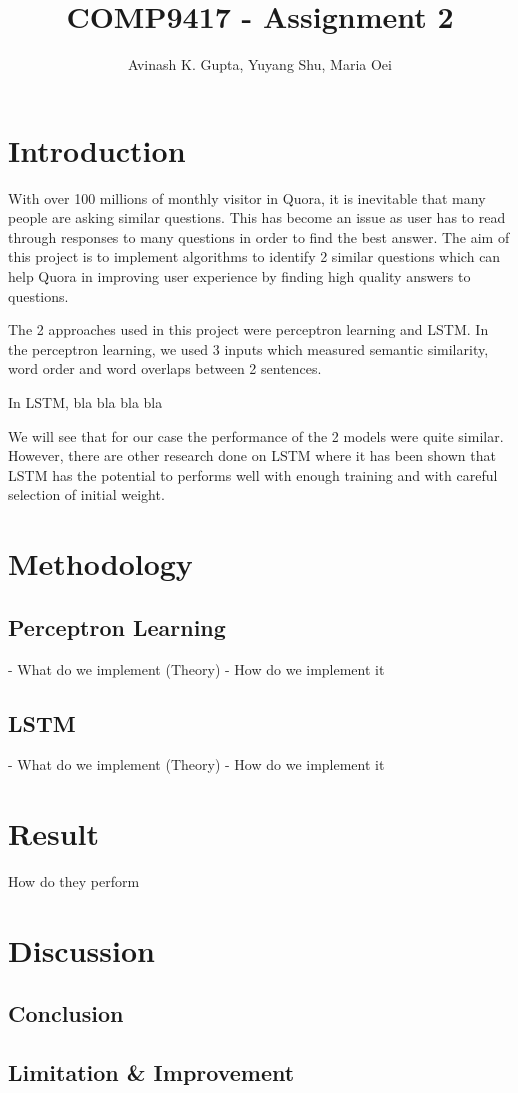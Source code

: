 \documentclass[11pt, oneside]{article}   	%
\title{COMP9417 - Assignment 2}
\author{Avinash K. Gupta, Yuyang Shu, Maria Oei}
\begin{document}
\maketitle


\section{Introduction}

With over 100 millions of monthly visitor in Quora, it is inevitable that many people are asking similar questions. This has become an issue as user has to read through responses to many questions in order to find the best answer. The aim of this project is to implement algorithms to identify 2 similar questions which can help Quora in improving user experience by finding high quality answers to questions.

The 2 approaches used in this project were perceptron learning and LSTM. In the perceptron learning, we used 3 inputs which measured semantic similarity, word order and word overlaps between 2 sentences.

In LSTM, bla bla bla bla

We will see that for our case the performance of the 2 models were quite similar. However, there are other research done on LSTM where it has been shown that LSTM has the potential to performs well with enough training and with careful selection of initial weight.

\section{Methodology}

\subsection{Perceptron Learning}
- What do we implement (Theory)
- How do we implement it

\subsection{LSTM}
- What do we implement (Theory)
- How do we implement it


\section{Result}
How do they perform

\section{Discussion}
\subsection{Conclusion}
 \subsection{Limitation \& Improvement}
\end{document}
